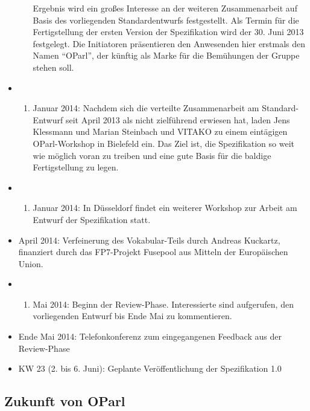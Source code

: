 \documentclass[,a4paper]{article}
\begin{document}
\begin{itemize}
\begin{enumerate}
    Ergebnis wird ein großes Interesse an der weiteren Zusammenarbeit
    auf Basis des vorliegenden Standardentwurfs festgestellt. Als Termin
    für die Fertigstellung der ersten Version der Spezifikation wird der
    30. Juni 2013 festgelegt. Die Initiatoren präsentieren den
    Anwesenden hier erstmals den Namen ``OParl'', der künftig als Marke
    für die Bemühungen der Gruppe stehen soll.
  \end{enumerate}
\item
  \begin{enumerate}
  \def\labelenumi{\arabic{enumi}.}
  \setcounter{enumi}{21}
  \itemsep1pt\parskip0pt
  \item
    Januar 2014: Nachdem sich die verteilte Zusammenarbeit am
    Standard-Entwurf seit April 2013 als nicht zielführend erwiesen hat,
    laden Jens Klessmann und Marian Steinbach und VITAKO zu einem
    eintägigen OParl-Workshop in Bielefeld ein. Das Ziel ist, die
    Spezifikation so weit wie möglich voran zu treiben und eine gute
    Basis für die baldige Fertigstellung zu legen.
  \end{enumerate}
\item
  \begin{enumerate}
  \def\labelenumi{\arabic{enumi}.}
  \setcounter{enumi}{25}
  \itemsep1pt\parskip0pt
  \item
    Januar 2014: In Düsseldorf findet ein weiterer Workshop zur Arbeit
    am Entwurf der Spezifikation statt.
  \end{enumerate}
\item
  April 2014: Verfeinerung des Vokabular-Teils durch Andreas Kuckartz,
  finanziert durch das FP7-Projekt Fusepool aus Mitteln der Europäischen
  Union.
\item
  \begin{enumerate}
  \def\labelenumi{\arabic{enumi}.}
  \setcounter{enumi}{5}
  \itemsep1pt\parskip0pt
  \item
    Mai 2014: Beginn der Review-Phase. Interessierte sind aufgerufen,
    den vorliegenden Entwurf bis Ende Mai zu kommentieren.
  \end{enumerate}
\item
  Ende Mai 2014: Telefonkonferenz zum eingegangenen Feedback aus der
  Review-Phase
\item
  KW 23 (2. bis 6. Juni): Geplante Veröffentlichung der Spezifikation
  1.0
\end{itemize}

\subsection{Zukunft von OParl}\label{zukunft-von-oparl}
\end{document}
